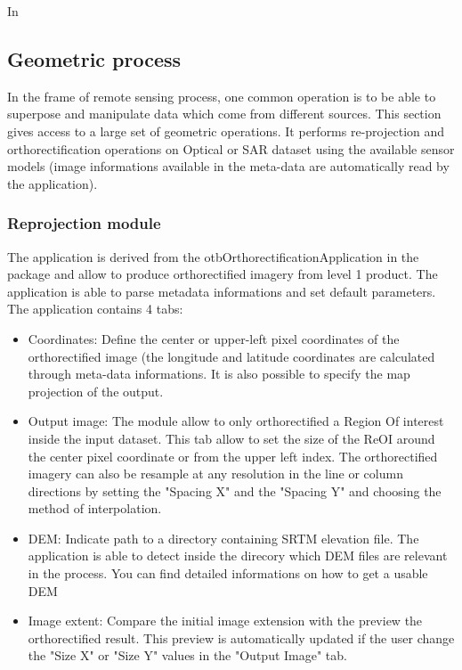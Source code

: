 In 

\subsection{Geometric process}
In the frame of remote sensing process, one common operation is to be
able to superpose and manipulate data which come from different
sources.  This section gives access to a large set of geometric
operations.  It performs re-projection and orthorectification
operations on Optical or SAR dataset using the available sensor models
(image informations available in the meta-data are automatically read
by the application).  
\subsubsection{Reprojection module}
The application is derived from the otbOrthorectificationApplication
in the \app package and allow to produce orthorectified imagery from
level 1 product. The application is able to parse metadata
informations and set default parameters. The application contains 4
tabs:

\begin{itemize}
\item Coordinates: Define the center or upper-left pixel coordinates
  of the orthorectified image (the longitude and latitude coordinates
  are calculated through meta-data informations. It is also possible
  to specify the map projection of the output.
\item Output image: The module allow to only orthorectified a Region
  Of interest inside the input dataset. This tab allow to set the size
  of the ReOI around the center pixel coordinate or from the upper
  left index. The orthorectified imagery can also be resample at any
  resolution in the line or column directions by setting the "Spacing
  X" and the "Spacing Y" and choosing the method of interpolation.
\item DEM: Indicate path to a directory containing SRTM elevation
  file. The application is able to detect inside the direcory which
  DEM files are relevant in the process. You can find detailed
  informations on how to get a usable DEM
\item Image extent: Compare the initial image extension with the
  preview the orthorectified result. This preview is automatically
  updated if the user change the "Size X" or "Size Y" values in the
  "Output Image" tab.
\end{itemize}

